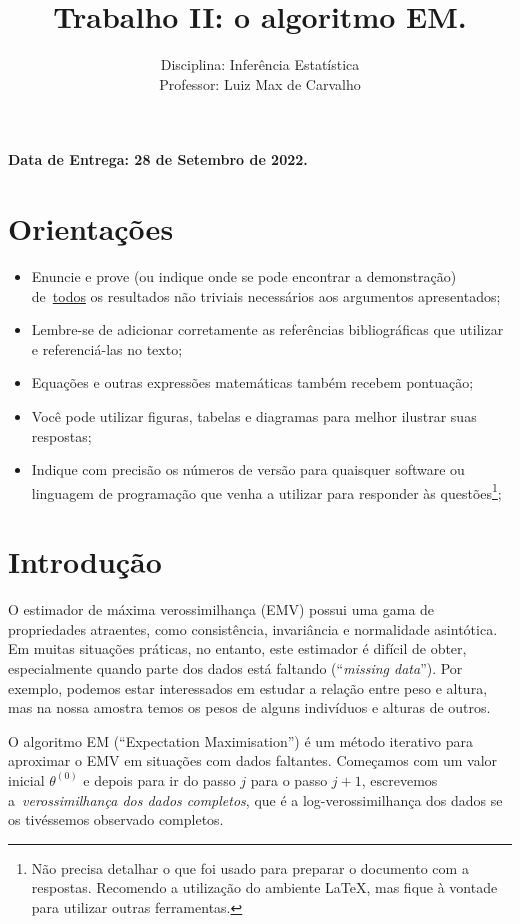 \documentclass[a4paper,10pt, notitlepage]{report}
\title{Trabalho II: o algoritmo EM.}
\author{Disciplina: Inferência Estatística \\ Professor: Luiz Max de Carvalho}
\begin{document}
\maketitle

\textbf{Data de Entrega: 28 de Setembro de 2022.}

\section*{Orientações}
\begin{itemize}
 \item Enuncie e prove (ou indique onde se pode encontrar a demonstração) de~\underline{todos} os resultados não triviais necessários aos argumentos apresentados;
 \item Lembre-se de adicionar corretamente as referências bibliográficas que utilizar e referenciá-las no texto;
 \item Equações e outras expressões matemáticas também recebem pontuação;
 \item Você pode utilizar figuras, tabelas e diagramas para melhor ilustrar suas respostas;
 \item Indique com precisão os números de versão para quaisquer software ou linguagem de programação que venha a utilizar para responder às questões\footnote{Não precisa detalhar o que foi usado para preparar o documento com a respostas. Recomendo a utilização do ambiente LaTeX, mas fique à vontade para utilizar outras ferramentas.};
 \end{itemize}


\section*{Introdução}

O estimador de máxima verossimilhança (EMV) possui uma gama de propriedades atraentes, como consistência, invariância e normalidade asintótica.
Em muitas situações práticas, no entanto, este estimador é difícil de obter, especialmente quando parte dos dados está faltando (``\textit{missing data}'').
Por exemplo, podemos estar interessados em estudar a relação entre peso e altura, mas na nossa amostra temos os pesos de alguns indivíduos e alturas de outros.

O algoritmo EM (``Expectation Maximisation'') é um método iterativo para aproximar o EMV em situações com dados faltantes.
Começamos com um valor inicial $\theta^{(0)}$ e depois para ir do passo $j$ para o passo $j + 1$, escrevemos a~\textit{verossimilhança dos dados completos}, que é a log-verossimilhança dos dados se os tivéssemos observado completos.
\end{document}
